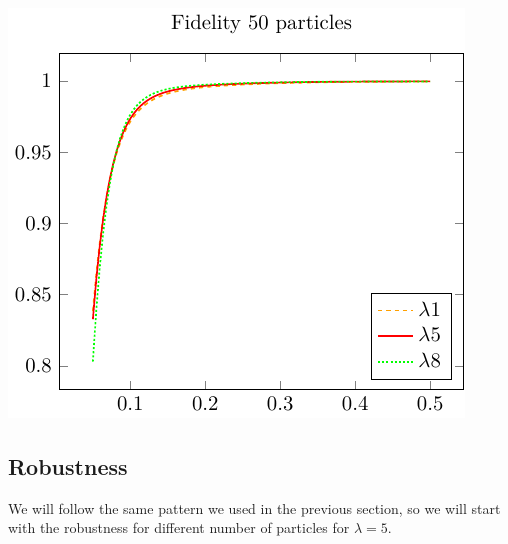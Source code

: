 \documentclass{article}
\begin{document}
\begin{center}
	\includegraphics{./gfx/fidelity_compare50.pdf}
\end{center}

\subsection{Robustness}
We will follow the same pattern we used in the previous section, so we will start with the robustness for different number of particles for $ \lambda = 5 $.
\end{document}
